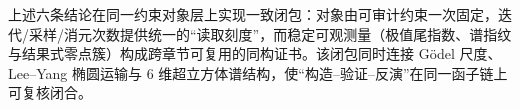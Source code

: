 \begin{remark}[同一对象层上的三重统一]\label{rem:conclusion-chebyshev-lee-yang-extreme-unified}
上述六条结论在同一约束对象层上实现一致闭包：对象由可审计约束一次固定，迭代/采样/消元次数提供统一的“读取刻度”，而稳定可观测量（极值尾指数、谱指纹与结果式零点簇）构成跨章节可复用的同构证书。该闭包同时连接 Gödel 尺度、Lee--Yang 椭圆运输与 \(6\) 维超立方体谱结构，使“构造--验证--反演”在同一函子链上可复核闭合。
\end{remark}
